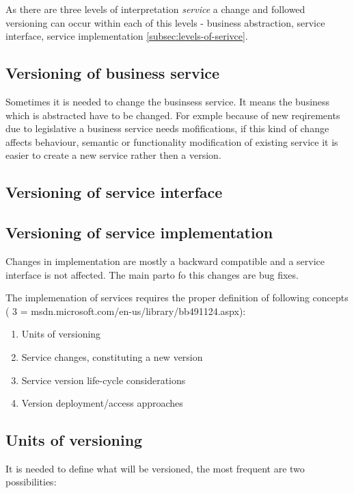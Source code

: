 As there are three levels of interpretation \emph{service} a change and followed versioning can occur within each of this levels - business abstraction, service interface, service implementation \ref{subsec:levels-of-serivce}.

\subsection{Versioning of business service}
Sometimes it is needed to change the businsess service. It means the business which is abstracted have to be changed. For exmple because of new reqirements due to legislative a business service needs mofifications, if this kind of change affects behaviour, semantic or functionality modification of existing service it is easier to create a new service rather then a version. 

\subsection{Versioning of service interface}

\subsection{Versioning of service implementation}
Changes in implementation are mostly a backward compatible and a service interface is not affected. The main parto fo this changes are bug fixes.


\bigskip 

The implemenation of services requires the proper definition of following concepts ( 3 = msdn.microsoft.com/en-us/library/bb491124.aspx):
\begin{enumerate}
  \item Units of versioning
  \item Service changes, constituting a new version
  \item Service version life-cycle considerations
  \item Version deployment/access approaches
\end{enumerate}

\subsection{Units of versioning}
It is needed to define what will be versioned, the most frequent are two possibilities:

